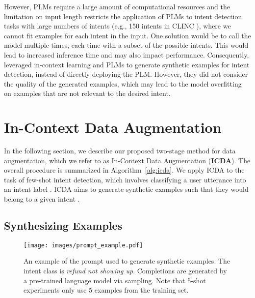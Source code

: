 \documentclass[11pt]{article}
\begin{document}
However, PLMs require a large amount of computational resources and the limitation on input length restricts the application of PLMs to intent detection tasks with large numbers of intents (e.g., 150 intents in CLINC \cite{larson-etal-2019-evaluation}), where we cannot fit examples for each intent in the input. One solution would be to call the model multiple times, each time with a subset of the possible intents. This would lead to increased inference time and may also impact performance.
Consequently, \citet{yoo-etal-2021-gpt3mix-leveraging,sahu-etal-2022-data} leveraged in-context learning and PLMs to generate synthetic examples for intent detection, instead of directly deploying the PLM.
However, they did not consider the quality of the generated examples, which may lead to the model overfitting on examples that are not relevant to the desired intent.



\section{In-Context Data Augmentation}
\label{sec:method}
In the following section, we describe our proposed two-stage method for data augmentation, which we refer to as In-Context Data Augmentation (\textbf{ICDA}).
The overall procedure is summarized in \mbox{Algorithm \ref{alg:icda}}. We apply ICDA to the task of few-shot intent detection, which involves classifying a user utterance  into an intent label . ICDA aims to generate synthetic examples  such that they would belong to a given intent .


\subsection{Synthesizing Examples}
\label{sec:synthetizing}

\begin{figure}[t]
    \centering
    \texttt{[image: images/prompt\_example.pdf]}
    \caption{An example of the prompt used to generate synthetic examples.  The intent class is \textit{refund not showing up}. Completions  are generated by a pre-trained language model via sampling. Note that 5-shot experiments only use 5 examples from the training set.}
    \label{fig:synthetic_example}
\end{figure}
\end{document}
